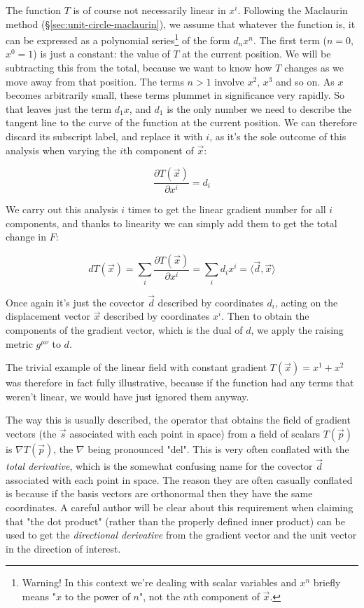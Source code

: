 The function $T$ is of course not necessarily linear in $x^i$. Following the Maclaurin method (§\ref{sec:unit-circle-maclaurin}), we assume that whatever the function is, it can be expressed as a polynomial series\footnote{Warning! In this context we're dealing with scalar variables and $x^n$ briefly means "$x$ to the power of $n$", not the $n$th component of $\vec{x}$.} of the form $d_n x^n$. The first term ($n = 0$, $x^0 = 1$) is just a constant: the value of $T$ at the current position. We will be subtracting this from the total, because we want to know how $T$ changes as we move away from that position. The terms $n > 1$ involve $x^2$, $x^3$ and so on. As $x$ becomes arbitrarily small, these terms plummet in significance very rapidly. So that leaves just the term $d_1 x$, and $d_1$ is the only number we need to describe the tangent line to the curve of the function at the current position. We can therefore discard its subscript label, and replace it with $i$, as it's the sole outcome of this analysis when varying the $i$th component of $\vec{x}$:

$$
\frac{\partial T(\vec{x})}{\partial x^i} = d_i
$$

We carry out this analysis $i$ times to get the linear gradient number for all $i$ components, and thanks to linearity we can simply add them to get the total change in $F$:

$$
d T(\vec{x}) = \sum_i \frac{\partial T(\vec{x})}{\partial x^i}
= \sum_i d_i x^i
= \langle \vec{d} , \vec{x} \rangle
$$

Once again it's just the covector $\vec{d}$ described by coordinates $d_i$, acting on the displacement vector $\vec{x}$ described by coordinates $x^i$. Then to obtain the components of the gradient vector, which is the dual of $d$, we apply the raising metric $g^{\mu\nu}$ to $d$.

The trivial example of the linear field with constant gradient $T(\vec{x}) = x^1 + x^2$ was therefore in fact fully illustrative, because if the function had any terms that weren't linear, we would have just ignored them anyway.

The way this is usually described, the operator that obtains the field of gradient vectors (the $\vec{s}$ associated with each point in space) from a field of scalars $T(\vec{p})$ is $\nabla T(\vec{p})$, the $\nabla$ being pronounced "del". This is very often conflated with the \textit{total derivative}, which is the somewhat confusing name for the covector $\vec{d}$ associated with each point in space. The reason they are often casually conflated is because if the basis vectors are orthonormal then they have the same coordinates. A careful author will be clear about this requirement when claiming that "the dot product" (rather than the properly defined inner product) can be used to get the \textit{directional derivative} from the gradient vector and the unit vector in the direction of interest.

